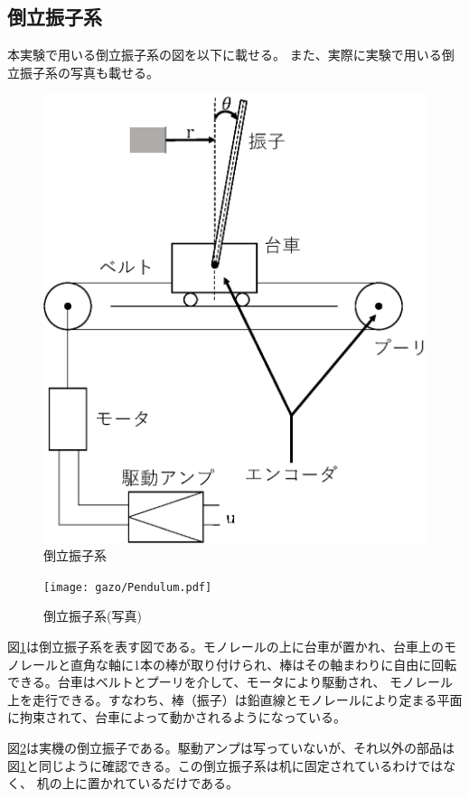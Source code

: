 \subsection{倒立振子系}
本実験で用いる倒立振子系の図を以下に載せる。
また、実際に実験で用いる倒立振子系の写真も載せる。
\begin{figure}[H]
	\centering
	\includegraphics[width=0.8\linewidth]{gazo/pendulum.eps}
	\caption{倒立振子系}
	\label{image:pendulum}
\end{figure}
\begin{figure}[H]
	\centering
	\texttt{[image: gazo/Pendulum.pdf]}
	\caption{倒立振子系(写真)}
	\label{image:pendulum_photo}
\end{figure}
図\ref{image:pendulum}は倒立振子系を表す図である。モノレールの上に台車が置かれ、台車上のモノレールと直角な軸に1本の棒が取り付けられ、棒はその軸まわりに自由に回転できる。台車はベルトとプーリを介して、モータにより駆動され、
モノレール上を走行できる。すなわち、棒（振子）は鉛直線とモノレールにより定まる平面に拘束されて、台車によって動かされるようになっている\cite{Koga:Binpe}。
\par
図\ref{image:pendulum_photo}は実機の倒立振子である。駆動アンプは写っていないが、それ以外の部品は図\ref{image:pendulum}と同じように確認できる。この倒立振子系は机に固定されているわけではなく、
机の上に置かれているだけである。
